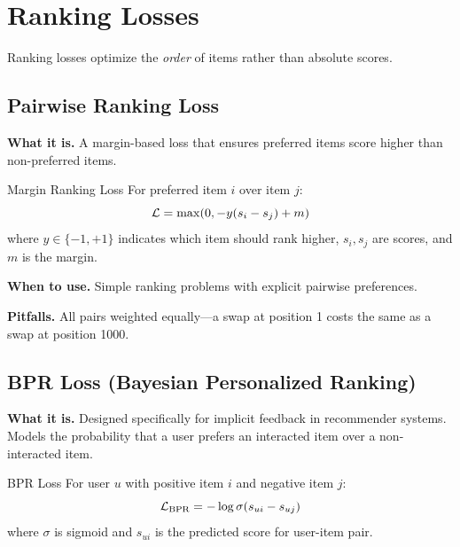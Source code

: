 \section{Ranking Losses}
\label{sec:ranking_losses}

Ranking losses optimize the \textit{order} of items rather than absolute scores.

\subsection{Pairwise Ranking Loss}

\textbf{What it is.} A margin-based loss that ensures preferred items score higher than non-preferred items.

\begin{mathresult}{Margin Ranking Loss}
For preferred item $i$ over item $j$:
\begin{equation}
\mathcal{L} = \max(0, -y(s_i - s_j) + m)
\end{equation}
where $y \in \{-1, +1\}$ indicates which item should rank higher, $s_i, s_j$ are scores, and $m$ is the margin.
\end{mathresult}

\textbf{When to use.} Simple ranking problems with explicit pairwise preferences.

\textbf{Pitfalls.} All pairs weighted equally---a swap at position 1 costs the same as a swap at position 1000.

\subsection{BPR Loss (Bayesian Personalized Ranking)}

\textbf{What it is.} Designed specifically for implicit feedback in recommender systems. Models the probability that a user prefers an interacted item over a non-interacted item.

\begin{mathresult}{BPR Loss}
For user $u$ with positive item $i$ and negative item $j$:
\begin{equation}
\mathcal{L}_{\text{BPR}} = -\log \sigma(s_{ui} - s_{uj})
\end{equation}
where $\sigma$ is sigmoid and $s_{ui}$ is the predicted score for user-item pair.
\end{mathresult}

